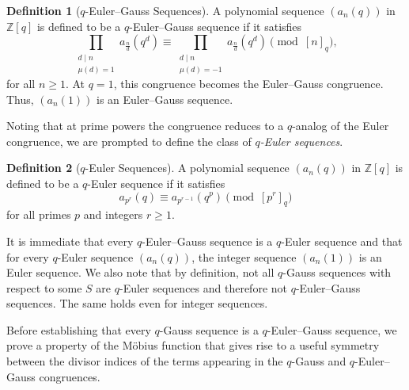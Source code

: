 \documentclass{article}
\numberwithin{equation}{section}
\theoremstyle{definition}
\newtheorem{definition}{\bf {Definition}}[section]
\begin{document}
\begin{definition}[$q$-Euler--Gauss Sequences]
    A polynomial sequence $(a_n(q))$ in $\mathbb{Z}[q]$ is defined to be a $q$-Euler--Gauss sequence if it satisfies 
    \begin{equation}\label{eq:17}
        \prod_{\substack{d\mid n \\ \mu(d)=1}} a_{\frac{n}{d}}(q^d) \equiv \prod_{\substack{d\mid n \\ \mu(d)=-1}} a_{\frac{n}{d}}(q^d)  \pmod{[n]_q},
    \end{equation}
    for all $n\geq1$. At $q=1$, this congruence becomes the Euler--Gauss congruence. Thus, $(a_{n}(1))$ is an Euler--Gauss sequence.
\end{definition}
Noting that at prime powers the congruence reduces to a $q$-analog of the Euler congruence, we are prompted to define the class of \textit{$q$-Euler sequences}.
\begin{definition}[$q$-Euler Sequences]
    A polynomial sequence $(a_n(q))$ in $\mathbb{Z}[q]$ is defined to be a $q$-Euler sequence if it satisfies 
    \[a_{p^r}(q)\equiv a_{p^{r-1}}(q^p)\pmod{[p^r]_q}\]
    for all primes $p$ and integers $r\geq1$.
\end{definition}
It is immediate that every $q$-Euler--Gauss sequence is a $q$-Euler sequence and that for every $q$-Euler sequence $(a_n(q))$, the integer sequence $(a_n(1))$ is an Euler sequence. We also note that by definition, not all $q$-Gauss sequences with respect to some $S$ are $q$-Euler sequences and therefore not $q$-Euler--Gauss sequences. The same holds even for integer sequences.

Before establishing that every $q$-Gauss sequence is a $q$-Euler--Gauss sequence, we prove a property of the M\"obius function that gives rise to a useful symmetry between the divisor indices of the terms appearing in the $q$-Gauss and $q$-Euler--Gauss congruences.
\end{document}
